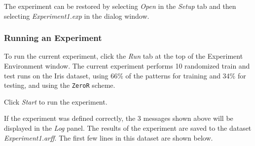 The experiment can be restored by selecting \textit{Open} in the \textit{Setup} tab and then selecting \textit{Experiment1.exp} in the dialog window.



\subsubsection{Running an Experiment}

To run the current experiment, click the \textit{Run} tab at the top of the Experiment Environment window. The current experiment performs 10 randomized train and test runs on the Iris dataset, using 66\% of the patterns for training and 34\% for testing, and using the \texttt{ZeroR} scheme.
\begin{center}
\end{center}

Click \textit{Start} to run the experiment.
\begin{center}
\end{center}

If the experiment was defined correctly, the 3 messages shown above will be displayed in the \textit{Log} panel. The results of the experiment are saved to the dataset \textit{Experiment1.arff}. The first few lines in this dataset are shown below.

